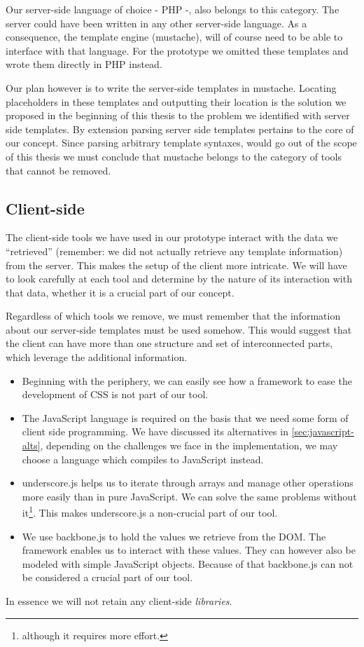 \documentclass[thesis.tex]{subfiles}
\begin{document}
Our server-side language of choice - PHP -, also belongs to this category.
The server could have been written in any other server-side language.
As a consequence, the template engine (mustache), will of course need to be
able to interface with that language. For the prototype we omitted these
templates and wrote them directly in PHP instead.

Our plan however is to write the server-side templates in mustache.
Locating placeholders in these templates and outputting their location
is the solution we proposed in the beginning of this thesis to the problem
we identified with server side templates.
By extension parsing server side templates pertains to the core of our concept.
Since parsing arbitrary template syntaxes, would go out of the scope of this
thesis we must conclude that mustache belongs to the category of tools that
cannot be removed.

\subsection{Client-side}
The client-side tools we have used in our prototype interact with the data we
``retrieved'' (remember: we did not actually retrieve any template information)
from the server. This makes the setup of the client more intricate. We will have
to look carefully at each tool and determine by the nature of its interaction
with that data, whether it is a crucial part of our concept.

Regardless of which tools we remove, we must remember that the information about
our server-side templates must be used somehow. This would suggest that the
client can have more than one structure and set of interconnected parts, which
leverage the additional information.

\begin{itemize}
\item Beginning with the periphery, we can easily see how a framework to ease
the development of CSS is not part of our tool.
\item The JavaScript language is required on the basis that we need some form of
client side programming. We have discussed its alternatives in
\ref{sec:javascript-alts}, depending on the challenges we face in the
implementation, we may choose a language which compiles to JavaScript instead.
\item underscore.js helps us to iterate through arrays and manage other
operations more easily than in pure JavaScript. We can solve the same problems
without it\footnote{
	although it requires more effort.
}. This makes underscore.js a non-crucial part of our tool.
\item We use backbone.js to hold the values we retrieve from the DOM. The
framework enables us to interact with these values. They can however also be
modeled with simple JavaScript objects. Because of that backbone.js can not be
considered a crucial part of our tool.
\end{itemize}

In essence we will not retain any client-side \emph{libraries}.
\end{document}
